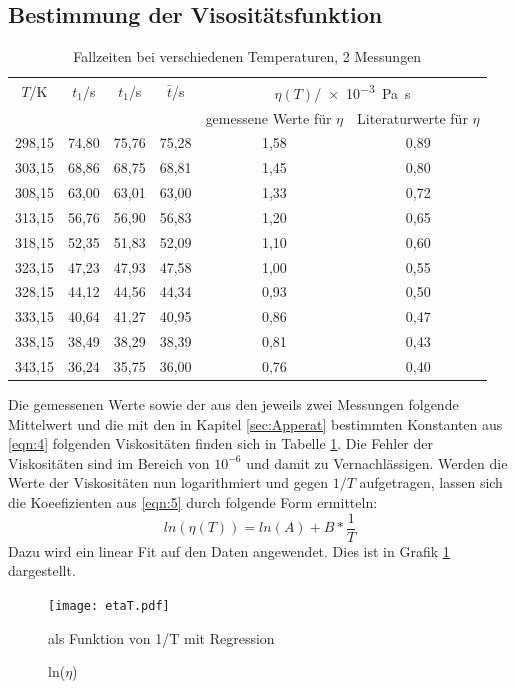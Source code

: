 \subsection{Bestimmung der Visositätsfunktion}
\begin{table}[h]
  \centering
  \caption{Fallzeiten bei verschiedenen Temperaturen, 2 Messungen}
  \label{tab:4}
  \begin{tabular}{c c c c c c}
    \toprule
    $T$/\si{\kelvin} & $t_1$/\si{\second} & $t_1$/\si{\second} & $\bar{t}$/\si{\second} & \multicolumn{2}{c}{$\eta(T)$/\SI{e-3}{\pascal\second}} \\
     &  &  &  & gemessene Werte für $\eta$ & Literaturwerte für $\eta$ \\
    \midrule
    298,15 & 74,80 & 75,76 & 75,28 & 1,58 & 0,89 \\
    303,15 & 68,86 & 68,75 & 68,81 & 1,45 & 0,80 \\
    308,15 & 63,00 & 63,01 & 63,00 & 1,33 & 0,72 \\
    313,15 & 56,76 & 56,90 & 56,83 & 1,20 & 0,65 \\
    318,15 & 52,35 & 51,83 & 52,09 & 1,10 & 0,60 \\
    323,15 & 47,23 & 47,93 & 47,58 & 1,00 & 0,55 \\
    328,15 & 44,12 & 44,56 & 44,34 & 0,93 & 0,50 \\
    333,15 & 40,64 & 41,27 & 40,95 & 0,86 & 0,47 \\
    338,15 & 38,49 & 38,29 & 38,39 & 0,81 & 0,43 \\
    343,15 & 36,24 & 35,75 & 36,00 & 0,76 & 0,40 \\
    \bottomrule
  \end{tabular}
\end{table}
Die gemessenen Werte sowie der aus den jeweils zwei Messungen folgende Mittelwert
und die mit den in Kapitel \ref{sec:Apperat} bestimmten Konstanten aus \eqref{eqn:4} folgenden
Viskositäten finden sich in Tabelle \ref{tab:4}. Die Fehler der Viskositäten sind im Bereich von $10^{-6}$
und damit zu Vernachlässigen. Werden die Werte der Viskositäten nun logarithmiert und gegen
$1/T$ aufgetragen, lassen sich die Koeefizienten aus \eqref{eqn:5} durch folgende Form
ermitteln:
\begin{equation}
  ln(\eta(T)) = ln(A) + B * \frac{1}{T}
\end{equation}
Dazu wird ein linear Fit auf den Daten angewendet. Dies ist in Grafik \ref{plot:1} dargestellt.
\begin{figure}[h]
  \centering
     \texttt{[image: etaT.pdf]}
  \caption{ln($\eta$)} als Funktion von 1/T mit Regression
  \label{plot:1}
\end{figure}
